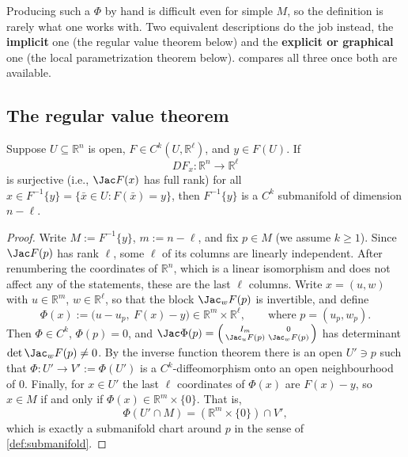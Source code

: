 \begin{remark}
Producing such a $\Phi$ by hand is difficult even for simple $M$, so the definition is rarely
what one works with. Two equivalent descriptions do the job instead, the \textbf{implicit} one
(the regular value theorem below) and the \textbf{explicit or graphical} one (the local
parametrization theorem below).  compares all three
once both are available.
\end{remark}

\subsection{The regular value theorem}

\begin{theorem}
\label{thm:regular_value_theorem}
Suppose $U \subseteq \mathbb{R}^n$ is open, $F \in C^k(U,\mathbb{R}^\ell)$, and $y \in F(U)$. If
\[DF_x : \mathbb{R}^n \to \mathbb{R}^\ell\]
is surjective (i.e., $\Jac F(x)$ has full rank) for all $x \in F^{-1}\{y\} = \{\bar x \in U :
F(\bar x) = y\}$, then $F^{-1}\{y\}$ is a $C^k$ submanifold of dimension $n-\ell$.
\end{theorem}

\begin{proof}
Write $M := F^{-1}\{y\}$, $m := n-\ell$, and fix $p \in M$ (we assume $k \geq 1$). Since $\Jac F(p)$
has rank $\ell$, some $\ell$ of its columns are linearly independent. After renumbering the
coordinates of $\mathbb{R}^n$, which is a linear isomorphism and does not affect any of the
statements, these are the last $\ell$ columns. Write $x = (u,w)$ with $u \in \mathbb{R}^m$,
$w \in \mathbb{R}^\ell$, so that the block $\Jac_wF(p)$ is invertible, and define
\[\Phi(x) := \big(u - u_p,\ F(x) - y\big) \in \mathbb{R}^m\times\mathbb{R}^\ell,
  \qquad\text{where } p = (u_p,w_p).\]
Then $\Phi \in C^k$, $\Phi(p) = 0$, and
$\Jac\Phi(p) = \left(\begin{smallmatrix} I_m & 0 \\ \Jac_uF(p) & \Jac_wF(p)\end{smallmatrix}\right)$
has determinant $\det\Jac_wF(p) \neq 0$. By the inverse function theorem there is an open
$U' \ni p$ such that $\Phi : U' \to V' := \Phi(U')$ is a $C^k$-diffeomorphism onto an open
neighbourhood of $0$. Finally, for $x \in U'$ the last $\ell$ coordinates of $\Phi(x)$ are $F(x)-y$,
so $x \in M$ if and only if $\Phi(x) \in \mathbb{R}^m\times\{0\}$. That is,
\[\Phi(U' \cap M) = (\mathbb{R}^m\times\{0\}) \cap V',\]
which is exactly a submanifold chart around $p$ in the sense of \cref{def:submanifold}.
\end{proof}

